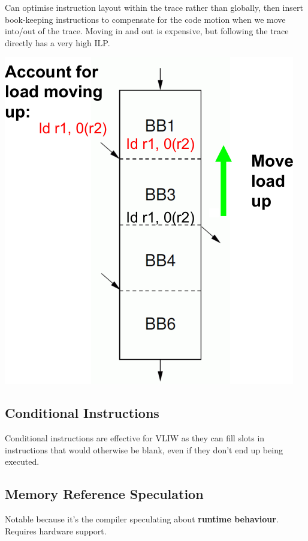 \documentclass[a4paper, 11pt]{article}
\begin{document}
{{{\begin{minipage}[t]{0.55\textwidth}
            Can optimise instruction layout within the trace rather than globally, then insert book-keeping instructions to compensate for the code motion when we move into/out of the trace. Moving in and out is expensive, but following the trace directly has a very high ILP.
            \end{minipage}
            \hspace{5mm}
            \begin{minipage}[t]{0.4\textwidth}
            \vspace{0pt}
            \centering
            \includegraphics[width=\textwidth]{trace-scheduling.png}
            \end{minipage}
        }
    }
    \subsection*{Conditional Instructions}
    {
        Conditional instructions are effective for VLIW as they can fill slots in instructions that would otherwise be blank, even if they don't end up being executed.
    }
    \subsection*{Memory Reference Speculation}
    {
        Notable because it's the compiler speculating about \textbf{runtime behaviour}. Requires hardware support.

}}
\end{document}
